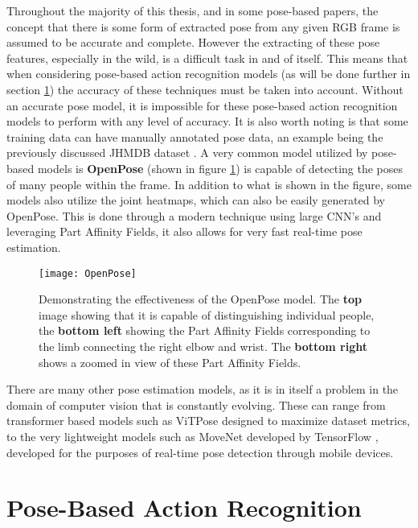 Throughout the majority of this thesis, and in some pose-based papers, the concept that there is some form of extracted pose from any given RGB frame is assumed to be accurate and complete. However the extracting of these pose features, especially in the wild, is a difficult task in and of itself. This means that when considering pose-based action recognition models (as will be done further in section \ref{sec:pose-based}) the accuracy of these techniques must be taken into account. Without an accurate pose model, it is impossible for these pose-based action recognition models to perform with any level of accuracy. It is also worth noting is that some training data can have manually annotated pose data, an example being the previously discussed JHMDB dataset \cite{JHMDB}. A very common model utilized by pose-based models is \textbf{OpenPose} \cite{openpose} (shown in figure \ref{fig:openpose}) is capable of detecting the poses of many people within the frame. In addition to what is shown in the figure, some models also utilize the joint heatmaps, which can also be easily generated by OpenPose. This is done through a modern technique using large CNN's and leveraging Part Affinity Fields, it also allows for very fast real-time pose estimation.

\begin{figure}[ht]
	\texttt{[image: OpenPose]}
	\centering
	\caption{Demonstrating the effectiveness of the OpenPose \cite{openpose} model. The \textbf{top} image showing that it is capable of distinguishing individual people, the \textbf{bottom left} showing the Part Affinity Fields corresponding to the limb connecting the right elbow and wrist. The \textbf{bottom right} shows a zoomed in view of these Part Affinity Fields.}
	\label{fig:openpose}
\end{figure}

There are many other pose estimation models, as it is in itself a problem in the domain of computer vision that is constantly evolving. These can range from transformer based models such as ViTPose \cite{vitpose} designed to maximize dataset metrics, to the very lightweight models such as MoveNet developed by TensorFlow \cite{tensorflow2015-whitepaper}, developed for the purposes of real-time pose detection through mobile devices.

\section{Pose-Based Action Recognition}
\label{sec:pose-based}

